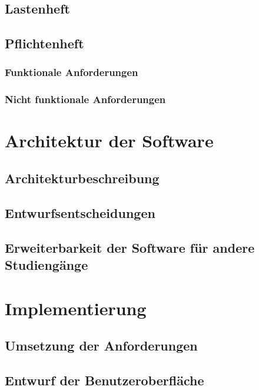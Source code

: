 \documentclass{scrreprt}
\begin{document}
\section{Lastenheft}

\section{Pflichtenheft}

\subsection{Funktionale Anforderungen}

\subsection{Nicht funktionale Anforderungen}


\chapter{Architektur der Software}

\section{Architekturbeschreibung}

\section{Entwurfsentscheidungen}

\section{Erweiterbarkeit der Software für andere Studiengänge}


\chapter{Implementierung}

\section{Umsetzung der Anforderungen}

\section{Entwurf der Benutzeroberfläche}
\end{document}
